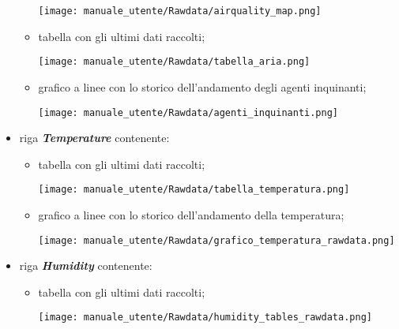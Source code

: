 \begin{itemize}
\begin{itemize}
        \begin{center}
            \texttt{[image: manuale\_utente/Rawdata/airquality\_map.png]}
        \end{center}
        \item tabella con gli ultimi dati raccolti;
        \begin{center}
            \texttt{[image: manuale\_utente/Rawdata/tabella\_aria.png]}
        \end{center}
        \item grafico a linee con lo storico dell'andamento degli agenti inquinanti;
        \begin{center}
            \texttt{[image: manuale\_utente/Rawdata/agenti\_inquinanti.png]}
        \end{center}
    \end{itemize}
    \item riga \textit{\textbf{Temperature}} contenente:
    \begin{itemize}
        \item tabella con gli ultimi dati raccolti;
        \begin{center}
            \texttt{[image: manuale\_utente/Rawdata/tabella\_temperatura.png]}
        \end{center}
        \item grafico a linee con lo storico dell'andamento della temperatura;
        \begin{center}
            \texttt{[image: manuale\_utente/Rawdata/grafico\_temperatura\_rawdata.png]}
        \end{center}
    \end{itemize}
    \item riga \textit{\textbf{Humidity}} contenente:
    \begin{itemize}
        \item tabella con gli ultimi dati raccolti;
        \begin{center}
            \texttt{[image: manuale\_utente/Rawdata/humidity\_tables\_rawdata.png]}

\end{center}
\end{itemize}
\end{itemize}
